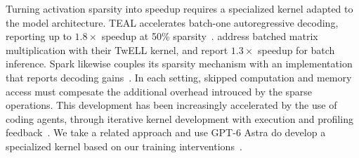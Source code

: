 Turning activation sparsity into speedup requires a specialized kernel adapted to the model architecture. TEAL accelerates batch-one autoregressive decoding, reporting up to $1.8\times$ speedup at 50\% sparsity~\citep{liu2024teal}. \citet{cetin2026sparser} address batched matrix multiplication with their TwELL kernel, and report $1.3\times$ speedup for batch inference. Spark likewise couples its sparsity mechanism with an implementation that reports decoding
gains~\citep{you2025spark}. In each setting, skipped computation and memory access must compesate the additional overhead introuced by the sparse operations. This development has been increasingly accelerated by the use of coding agents, through iterative kernel development with execution and profiling feedback~\citep{ouyang2025kernelbench,luo2026agentic}. We take a related approach and use GPT-6 Astra do develop a specialized kernel based on our training interventions~\citep{openaigpt6astra}.


